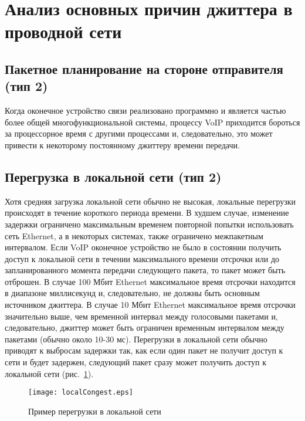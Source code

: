 \section{Анализ основных причин джиттера в проводной сети} \label{sect2_1}

\subsection{Пакетное планирование на стороне отправителя (тип 2)} \label{subsect2_1_1}
Когда оконечное устройство связи реализовано программно и является частью более общей многофункциональной системы, процессу VoIP приходится бороться за процессорное время с другими процессами и, следовательно, это может привести к некоторому постоянному джиттеру времени передачи.

\subsection{Перегрузка в локальной сети (тип 2)} \label{subsect2_1_2}
Хотя средняя загрузка локальной сети обычно не высокая, локальные перегрузки происходят в течение короткого периода времени. В худшем случае, изменение задержки ограничено максимальным временем повторной попытки использовать сеть Ethernet, а в некоторых системах, также ограничено межпакетным интервалом.
Если VoIP оконечное устройство не было в состоянии получить доступ к локальной сети в течении максимального времени отсрочки или до запланированного момента передачи следующего пакета, то пакет может быть отброшен. В случае 100 Мбит Ethernet максимальное время отсрочки находится в диапазоне миллисекунд и, следовательно, не должны быть основным источником джиттера. В случае 10 Мбит Ethernet максимальное время отсрочки значительно выше, чем временной интервал между голосовыми пакетами и, следовательно, джиттер может быть ограничен временным интервалом между пакетами (обычно около 10-30 мс).
Перегрузки в локальной сети обычно приводят к выбросам задержки так, как если один пакет не получит доступ к сети и будет задержен, следующий пакет сразу может получить доступ к локальной сети (рис. \ref{img:localCongest}).

\begin{figure} [h]
  \center
\texttt{[image: localCongest.eps]}
  \caption{Пример перегрузки в локальной сети \cite{clark}}
  \label{img:localCongest}
\end{figure}

